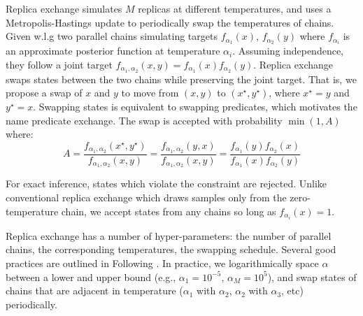 Replica exchange simulates $M$ replicas at different temperatures, and uses a Metropolis-Hastings update to  periodically swap the temperatures of chains.
Given w.l.g two parallel chains simulating targets $f_{\alpha_1}(x)$, $f_{\alpha_2}(y)$ where $f_{\alpha_i}$ is an approximate posterior function at temperature $\alpha_i$.
Assuming independence, they follow a joint target $f_{\alpha_1, \alpha_2}(x,y) = f_{\alpha_1}(x)f_{\alpha_2}(y)$.
Replica exchange swaps states between the two chains while preserving the joint target.
That is, we propose a swap of $x$ and $y$ to move from $(x, y)$ to $(x^\star,y^\star)$, where $x^\star=y$ and $y^\star=x$.
Swapping states is equivalent to swapping predicates, which motivates the name predicate exchange.
The swap is accepted with probability $\min(1, A)$ where:
\begin{equation}
A = \frac{f_{\alpha_1, \alpha_2}(x^\star,y^\star)}{f_{\alpha_1, \alpha_2}(x,y)} = \frac{f_{\alpha_1, \alpha_2}(y,x)}{f_{\alpha_1, \alpha_2}(x,y)} = \frac{f_{\alpha_1}(y)f_{\alpha_2}(x)}{f_{\alpha_1}(x)f_{\alpha_2}(y)}
\end{equation}

For exact inference, states which violate the constraint are rejected.
Unlike conventional replica exchange which draws samples only from the zero-temperature chain, we accept states from any chains so long as $f_{\alpha_i}(x) = 1$.

Replica exchange has a number of hyper-parameters: the number of parallel chains, the corresponding temperatures, the swapping schedule.
Several good practices are outlined in Following \cite{earl2005parallel}.  In practice, we logarithmically space $\alpha$ between a lower and upper bound (e.g., $\alpha_1 = 10^{-5}$, $\alpha_M = 10^5$), and swap states of chains that are adjacent in temperature ($\alpha_1$ with $\alpha_2$, $\alpha_2$ with $\alpha_3$, etc) periodically.


